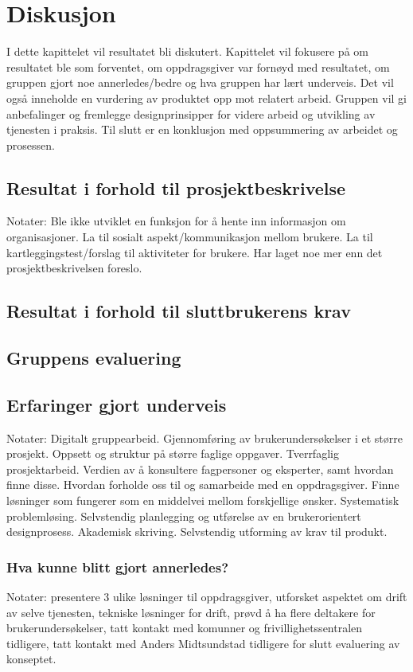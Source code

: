 \cleardoublepage
\chapter{Diskusjon}
\label{chap:discussion} 

I dette kapittelet vil resultatet bli diskutert. Kapittelet vil fokusere på om resultatet ble som forventet, om oppdragsgiver var fornøyd med resultatet, om gruppen gjort noe annerledes/bedre og hva gruppen har lært underveis. Det vil også inneholde en vurdering av produktet opp mot relatert arbeid. Gruppen vil gi anbefalinger og fremlegge designprinsipper for videre arbeid og utvikling av tjenesten i praksis. Til slutt er en konklusjon med oppsummering av arbeidet og prosessen.

\section{Resultat i forhold til prosjektbeskrivelse}
Notater:
Ble ikke utviklet en funksjon for å hente inn informasjon om organisasjoner.
La til sosialt aspekt/kommunikasjon mellom brukere.
La til kartleggingstest/forslag til aktiviteter for brukere.
Har laget noe mer enn det prosjektbeskrivelsen foreslo.

\section{Resultat i forhold til sluttbrukerens krav}

\section{Gruppens evaluering}

\section{Erfaringer gjort underveis}
Notater:
Digitalt gruppearbeid.
Gjennomføring av brukerundersøkelser i et større prosjekt.
Oppsett og struktur på større faglige oppgaver.
Tverrfaglig prosjektarbeid.
Verdien av å konsultere fagpersoner og eksperter, samt hvordan finne disse.
Hvordan forholde oss til og samarbeide med en oppdragsgiver.
Finne løsninger som fungerer som en middelvei mellom forskjellige ønsker.
Systematisk problemløsing.
Selvstendig planlegging og utførelse av en brukerorientert designprosess.
Akademisk skriving.
Selvstendig utforming av krav til produkt.

\subsection{Hva kunne blitt gjort annerledes?}
Notater: presentere 3 ulike løsninger til oppdragsgiver, utforsket aspektet om drift av selve tjenesten, tekniske løsninger for drift, prøvd å ha flere deltakere for brukerundersøkelser, tatt kontakt med komunner og frivillighetssentralen tidligere, tatt kontakt med Anders Midtsundstad tidligere for slutt evaluering av konseptet.

